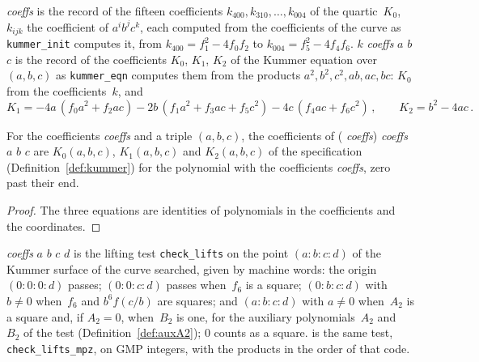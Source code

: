 \begin{definition}\label{def:kummerInit}
  \leanok
   \textit{coeffs} is the record  of the
  fifteen coefficients $k_{400}, k_{310}, \dots, k_{004}$ of the quartic~$K_0$, $k_{ijk}$ the
  coefficient of $a^i b^j c^k$, each computed from the coefficients of the curve as
  \texttt{kummer\_init} computes it, from $k_{400} = f_1^2 - 4f_0f_2$ to $k_{004} = f_5^2 -
  4f_4f_6$.  $k$ \textit{coeffs} $a$ $b$ $c$ is the record
   of the coefficients $K_0$, $K_1$, $K_2$ of the Kummer equation over
  $(a, b, c)$ as \texttt{kummer\_eqn} computes them from the products $a^2, b^2, c^2, ab, ac, bc$:
  $K_0$ from the coefficients~$k$, and
  \[
    K_1 = -4a\,(f_0a^2 + f_2ac) - 2b\,(f_1a^2 + f_3ac + f_5c^2) - 4c\,(f_4ac + f_6c^2)\,, \qquad
    K_2 = b^2 - 4ac\,.
  \]
\end{definition}

\begin{lemma}\label{lem:kummerEqn_kummerInit}
  \leanok
  For the coefficients \textit{coeffs} and a triple $(a, b, c)$, the coefficients of
   ( \textit{coeffs}) \textit{coeffs} $a$ $b$ $c$
  are $K_0(a, b, c)$, $K_1(a, b, c)$ and $K_2(a, b, c)$ of the specification
  (Definition~\ref{def:kummer}) for the polynomial with the coefficients \textit{coeffs}, zero past
  their end.
\end{lemma}

\begin{proof}
  \leanok
  The three equations are identities of polynomials in the coefficients and the coordinates.
\end{proof}

\begin{definition}\label{def:checkLifts}
  \leanok
   \textit{coeffs} $a$ $b$ $c$ $d$ is the lifting test
  \texttt{check\_lifts} on the point $(a : b : c : d)$ of the Kummer surface of the curve searched,
  given by machine words: the origin $(0 : 0 : 0 : d)$ passes; $(0 : 0 : c : d)$ passes when~$f_6$
  is a square; $(0 : b : c : d)$ with $b \ne 0$ when~$f_6$ and $b^6 f(c/b)$ are squares; and
  $(a : b : c : d)$ with $a \ne 0$ when~$A_2$ is a square and, if $A_2 = 0$, when~$B_2$ is one,
  for the auxiliary polynomials~$A_2$ and~$B_2$ of the test (Definition~\ref{def:auxA2}); $0$ counts
  as a square.  is the same test, \texttt{check\_lifts\_mpz}, on GMP
  integers, with the products in the order of that code.
\end{definition}

